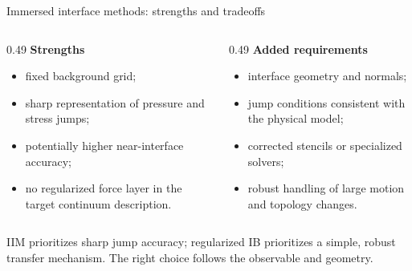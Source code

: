 \documentclass[aspectratio=169,11pt]{beamer}
\begin{document}
\begin{frame}{Immersed interface methods: strengths and tradeoffs}
\begin{columns}[T,onlytextwidth]
\begin{column}{0.49\textwidth}
\textbf{Strengths}
\begin{itemize}\itemsep6pt
  \item fixed background grid;
  \item sharp representation of pressure and stress jumps;
  \item potentially higher near-interface accuracy;
  \item no regularized force layer in the target continuum description.
\end{itemize}
\end{column}
\begin{column}{0.49\textwidth}
\textbf{Added requirements}
\begin{itemize}\itemsep6pt
  \item interface geometry and normals;
  \item jump conditions consistent with the physical model;
  \item corrected stencils or specialized solvers;
  \item robust handling of large motion and topology changes.
\end{itemize}
\end{column}
\end{columns}
\begin{punchbox}
\small IIM prioritizes sharp jump accuracy; regularized IB prioritizes a simple, robust transfer mechanism. The right choice follows the observable and geometry.
\end{punchbox}
\end{frame}
\end{document}
